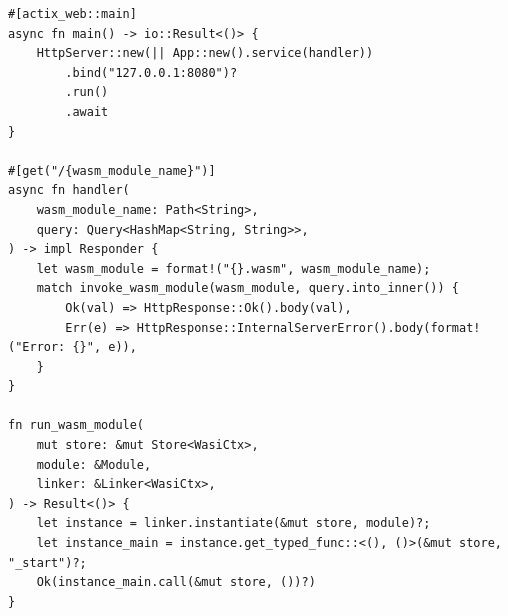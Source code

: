 \begin{lstlisting}[frame=lines, style=Rust, caption={actix http server with a handler function to invoce the wasm modules}, showstringspaces=false, captionpos=b]
#[actix_web::main]
async fn main() -> io::Result<()> {
    HttpServer::new(|| App::new().service(handler))
        .bind("127.0.0.1:8080")?
        .run()
        .await
}

#[get("/{wasm_module_name}")]
async fn handler(
    wasm_module_name: Path<String>,
    query: Query<HashMap<String, String>>,
) -> impl Responder {
    let wasm_module = format!("{}.wasm", wasm_module_name);
    match invoke_wasm_module(wasm_module, query.into_inner()) {
        Ok(val) => HttpResponse::Ok().body(val),
        Err(e) => HttpResponse::InternalServerError().body(format!("Error: {}", e)),
    }
}

fn run_wasm_module(
    mut store: &mut Store<WasiCtx>,
    module: &Module,
    linker: &Linker<WasiCtx>,
) -> Result<()> {
    let instance = linker.instantiate(&mut store, module)?;
    let instance_main = instance.get_typed_func::<(), ()>(&mut store, "_start")?;
    Ok(instance_main.call(&mut store, ())?)
}
\end{lstlisting}




